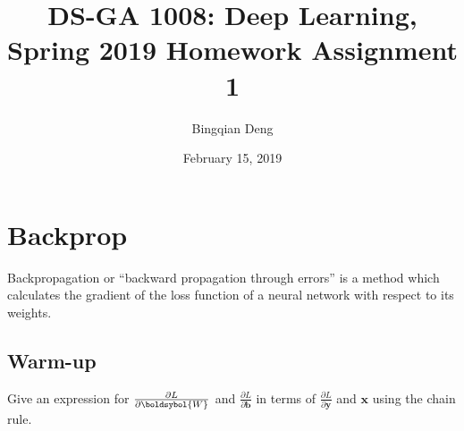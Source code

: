 \documentclass{article}
\title{DS-GA 1008: Deep Learning, Spring 2019 Homework Assignment 1}
\author{Bingqian Deng }
\date{February 15, 2019}
\begin{document}
\maketitle

\section{Backprop}
Backpropagation or “backward propagation through errors” is a method which calculates the gradient of the loss function of a neural network with respect to its weights.

\subsection{Warm-up}
Give an expression for $\frac { \partial L } { \partial \boldsybol { W } }$ and $\frac { \partial L } { \partial \boldsymbol{ b} }$ in terms of $\frac { \partial L } { \partial \boldsymbol { y } }$ and $\boldsymbol { x }$
using the chain rule.\\
\end{document}
